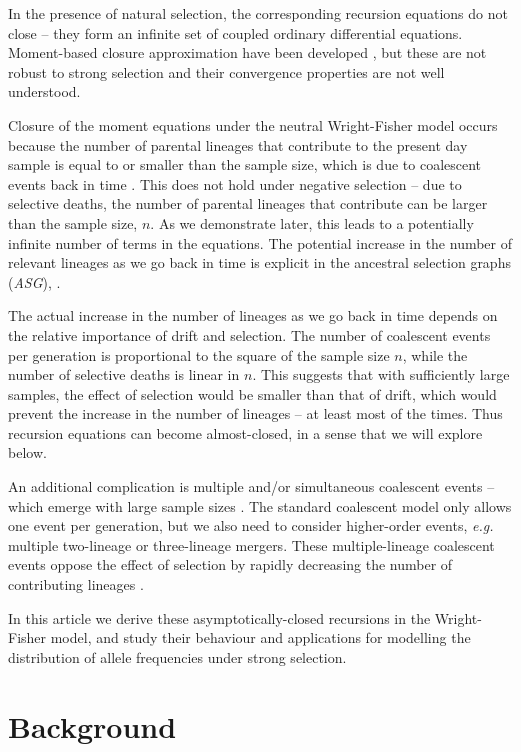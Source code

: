 \documentclass[review]{elsarticle}
\begin{document}
In the presence of natural selection, the corresponding recursion equations do not close
\citep{Donnelly, JouganousEtAl2017} -- they form an infinite set of coupled ordinary differential
equations. Moment-based closure approximation have been developed \citep{JouganousEtAl2017}, but
these are not robust to strong selection and their convergence properties are not well understood.

Closure of the moment equations under the neutral Wright-Fisher model occurs because the number of
parental lineages that contribute to the present day sample is equal to or smaller than the sample
size, which is due to coalescent events back in time \citep{Kingman1982a}. This does not hold under
negative selection -- due to selective deaths, the number of parental lineages that contribute can
be larger than the sample size, $n$. As we demonstrate later, this leads to a potentially infinite
number of terms in the equations. The potential increase in the number of relevant lineages as we go
back in time is explicit in the ancestral selection graphs (\textit{ASG}),
\citep{KroneNeuhauser1997}.

The actual increase in the number of lineages as we go back in time depends on the relative
importance of drift and selection. The number of coalescent events per generation is proportional to
the square of the sample size $n$, while the number of selective deaths is linear in $n$. This
suggests that with sufficiently large samples, the effect of selection would be smaller than that of
drift, which would prevent the increase in the number of lineages -- at least most of the times.
Thus recursion equations can become almost-closed, in a sense that we will explore below.

An additional complication is multiple and/or simultaneous coalescent events -- which emerge with
large sample sizes \citep{BhaskarEtAl2014}. The standard coalescent model only allows one event per
generation, but we also need to consider higher-order events, \textit{e.g.} multiple two-lineage or
three-lineage mergers. These multiple-lineage coalescent events oppose the effect of selection by
rapidly decreasing the number of contributing lineages \citep{NelsonEtAl2019}.

In this article we derive these asymptotically-closed recursions in the Wright-Fisher model, and
study their behaviour and applications for modelling the distribution of allele frequencies under
strong selection.

\section{Background}
\label{sec:background}
\end{document}
